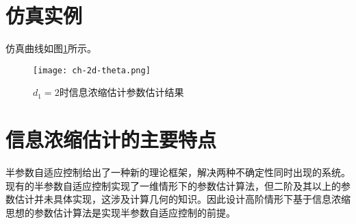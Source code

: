 \section{仿真实例}\label{sect:3.4}
仿真曲线如图\ref{fig.2d.theta}所示。
\begin{figure}
	\centering
	\texttt{[image: ch-2d-theta.png]}\\	 %
	\caption{$d_{1}=2$时信息浓缩估计参数估计结果}
	\label{fig.2d.theta}
\end{figure}

\section{信息浓缩估计的主要特点}\label{sect:3.5}
半参数自适应控制给出了一种新的理论框架，解决两种不确定性同时出现的系统。现有的半参数自适应控制实现了一维情形下的参数估计算法，但二阶及其以上的参数估计并未具体实现，这涉及计算几何的知识。因此设计高阶情形下基于信息浓缩思想的参数估计算法是实现半参数自适应控制的前提。
